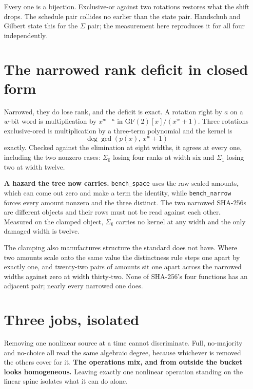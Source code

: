 Every one is a bijection. Exclusive-or against two rotations restores what the shift drops. The schedule pair collides no earlier than the state pair. Handschuh and Gilbert state this for the \(\Sigma\) pair; the measurement here reproduces it for all four independently.

\section{The narrowed rank deficit in closed form}

Narrowed, they do lose rank, and the deficit is exact. A rotation right by \(a\) on a \(w\)-bit word is multiplication by \(x^{w-a}\) in \(\mathrm{GF}(2)[x]/(x^w + 1)\). Three rotations exclusive-ored is multiplication by a three-term polynomial and the kernel is
\[
  \deg \gcd\!\left(p(x),\, x^w + 1\right)
\]
exactly. Checked against the elimination at eight widths, it agrees at every one, including the two nonzero cases: \(\Sigma_0\) losing four ranks at width six and \(\Sigma_1\) losing two at width twelve.

\textbf{A hazard the tree now carries.} \texttt{bench\_\allowbreak{}space} uses the raw scaled amounts, which can come out zero and make a term the identity, while \texttt{bench\_\allowbreak{}narrow} forces every amount nonzero and the three distinct. The two narrowed SHA-256s are different objects and their rows must not be read against each other. Measured on the clamped object, \(\Sigma_0\) carries no kernel at any width and the only damaged width is twelve.

The clamping also manufactures structure the standard does not have. Where two amounts scale onto the same value the distinctness rule steps one apart by exactly one, and twenty-two pairs of amounts sit one apart across the narrowed widths against zero at width thirty-two. None of SHA-256's four functions has an adjacent pair; nearly every narrowed one does.

\section{Three jobs, isolated}

Removing one nonlinear source at a time cannot discriminate. Full, no-majority and no-choice all read the same algebraic degree, because whichever is removed the others cover for it. \textbf{The operations mix, and from outside the bucket looks homogeneous.} Leaving exactly one nonlinear operation standing on the linear spine isolates what it can do alone.

